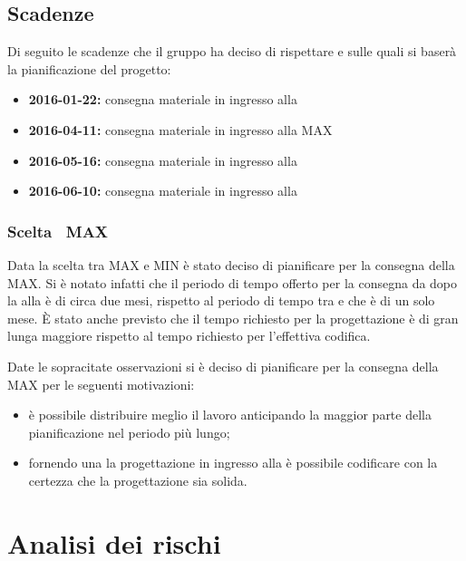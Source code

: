 \documentclass[12pt,a4paper]{article}
\begin{document}
\subsection{Scadenze}
Di seguito le scadenze che il gruppo \nomeGruppo{} ha deciso di rispettare e sulle quali si baserà la pianificazione del progetto:
\begin{itemize}
	\item \textbf{2016-01-22:} consegna materiale in ingresso alla \RR{}
	\item \textbf{2016-04-11:} consegna materiale in ingresso alla \RP{} MAX
	\item \textbf{2016-05-16:} consegna materiale in ingresso alla \RQ{}
	\item \textbf{2016-06-10:} consegna materiale in ingresso alla \RA{}
\end{itemize}

\subsubsection{Scelta \RP\ MAX}
\label{sec:scelta-rp}
Data la scelta tra \RP{} MAX e \RP{} MIN è stato deciso di pianificare per la consegna della \RP{} MAX.
Si è notato infatti che il periodo di tempo offerto per la consegna da dopo la \RR{} alla \RP{} è di circa due mesi, rispetto al periodo di tempo tra \RP{} e \RQ{} che è di un solo mese. È stato anche previsto che il tempo richiesto per la progettazione è di gran lunga maggiore rispetto al tempo richiesto per l'effettiva codifica.

Date le sopracitate osservazioni si è deciso di pianificare per la consegna della \RP{} MAX per le seguenti motivazioni:
\begin{itemize}
    \item è possibile distribuire meglio il lavoro anticipando la maggior parte della pianificazione nel periodo più lungo;
    \item fornendo una la progettazione in ingresso alla \RP{} è possibile codificare con la certezza che la progettazione sia solida.
\end{itemize}

\newpage

\section{Analisi dei rischi}
\end{document}

